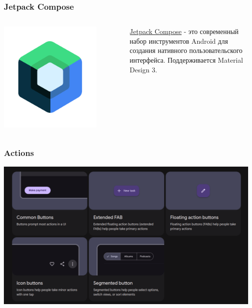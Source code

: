 \documentclass[12pt]{beamer}
\begin{document}
    \begin{frame}
        \frametitle{Jetpack Compose}

        \begin{columns}

            \begin{column}{0.5\textwidth}
                \includegraphics[width=0.8\textwidth]{jc.png}
            \end{column}

            \begin{column}{0.5\textwidth}
                \href{https://developer.android.com/compose}{Jetpack Compose}
                - это современный набор инструментов Android
                для создания нативного пользовательского интерфейса.
                Поддерживается Material Design 3.
            \end{column}

        \end{columns}

    \end{frame}

    \begin{frame}
        \frametitle{Actions}
    
        \includegraphics[width=1\textwidth]{actions.png}
    
    \end{frame}

	\begin{frame}[containsverbatim]
		\begin{verbatim}
			
		\end{verbatim}
	\end{frame}
	
\end{document}
